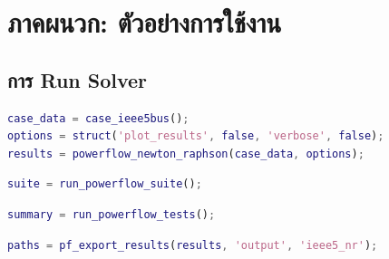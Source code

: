 \documentclass[12pt,a4paper]{article}
\begin{document}
\section*{ภาคผนวก: ตัวอย่างการใช้งาน}

\subsection*{การ Run Solver}

\begin{lstlisting}[language=Matlab, caption={Basic Newton-Raphson solve}]
case_data = case_ieee5bus();
options = struct('plot_results', false, 'verbose', false);
results = powerflow_newton_raphson(case_data, options);
\end{lstlisting}

\begin{lstlisting}[language=Matlab, caption={Running the full comparison suite}]
suite = run_powerflow_suite();
\end{lstlisting}

\begin{lstlisting}[language=Matlab, caption={Running automated tests}]
summary = run_powerflow_tests();
\end{lstlisting}

\begin{lstlisting}[language=Matlab, caption={Exporting results}]
paths = pf_export_results(results, 'output', 'ieee5_nr');
\end{lstlisting}
\end{document}

